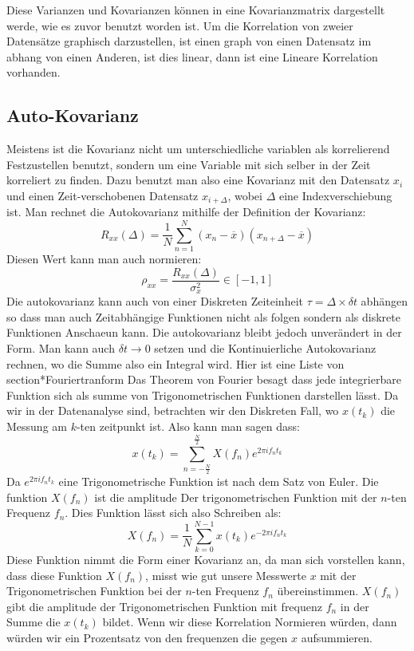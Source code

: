 \documentclass{article}
\begin{document}
Diese Varianzen und Kovarianzen können in eine Kovarianzmatrix dargestellt werde, wie es zuvor benutzt worden ist.\newline
Um die Korrelation von zweier Datensätze graphisch darzustellen, ist einen graph von einen Datensatz im abhang von einen Anderen, ist dies linear, dann ist eine Lineare Korrelation vorhanden.
\hypertarget{autokovarianz}{\subsection*{Auto-Kovarianz}} Meistens ist die Kovarianz nicht um unterschiedliche variablen als korrelierend Festzustellen benutzt, sondern um eine Variable mit sich selber in der Zeit korreliert zu finden. Dazu benutzt man also eine Kovarianz mit den Datensatz $x_i$ und einen Zeit-verschobenen Datensatz $x_{i+\Delta}$, wobei $\Delta$ eine Indexverschiebung ist.
Man rechnet die Autokovarianz mithilfe der Definition der Kovarianz:
\[R_{xx}(\Delta)=\frac{1}{N}\sum_{n=1}^{N}(x_n-\overline{x})(x_{n+\Delta}-\overline{x})\]
Diesen Wert kann man auch normieren: \[\rho_{xx}=\frac{R_{xx}(\Delta)}{\sigma^2_x}\in[-1,1]\]
Die autokovarianz kann auch von einer Diskreten Zeiteinheit $\tau=\Delta\times\delta t$ abhängen so dass man auch Zeitabhängige Funktionen nicht als folgen sondern als diskrete Funktionen Anschaeun kann. Die autokovarianz bleibt jedoch unverändert in der Form. Man kann auch $\delta t \rightarrow 0$ setzen und die Kontinuierliche Autokovarianz rechnen, wo die Summe also ein Integral wird. 
\newline Hier ist eine Liste von
\hypertarget{fouriertransform}{section*{Fouriertranform}}
Das Theorem von Fourier besagt dass jede integrierbare Funktion sich als summe von Trigonometrischen Funktionen darstellen lässt. Da wir in der Datenanalyse sind, betrachten wir den Diskreten Fall, wo $x(t_k)$ die Messung am $k$-ten zeitpunkt ist. Also kann man sagen dass:
\[x(t_k)=\sum_{n=-\frac{N}{2}}^{\frac{N}{2}}X(f_n)e^{2\pi i f_n t_k}\] Da $e^{2\pi i f_n t_k}$ eine Trigonometrische Funktion ist nach dem Satz von Euler. Die funktion $X(f_n)$ ist die amplitude Der trigonometrischen Funktion mit der $n$-ten Frequenz $f_n$. Dies Funktion lässt sich also Schreiben als:
\[X(f_n)=\frac{1}{N}\sum_{k=0}^{N-1}x(t_k)e^{-2\pi i f_n t_k}\] Diese Funktion nimmt die Form einer Kovarianz an, da man sich vorstellen kann, dass diese Funktion $X(f_n)$, misst wie gut unsere Messwerte $x$ mit der Trigonometrischen Funktion bei der $n$-ten Frequenz $f_n$ übereinstimmen. $X(f_n)$ gibt die amplitude der Trigonometrischen Funktion mit frequenz $f_n$ in der Summe die $x(t_k)$ bildet.
Wenn wir diese Korrelation Normieren würden, dann würden wir ein Prozentsatz von den frequenzen die gegen $x$ aufsummieren.
\end{document}
